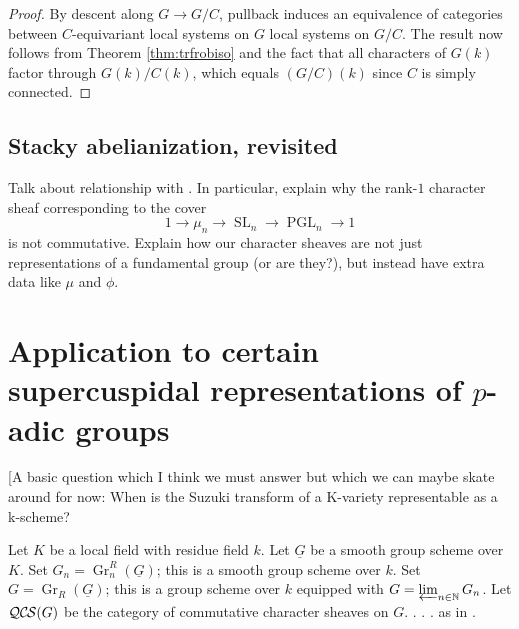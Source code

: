 \documentclass[10pt]{amsart}
\theoremstyle{plain}
\theoremstyle{definition}
\newcommand{\NN}{{\mathbb{N}}}
\newcommand{\Fq}{k}
\DeclareMathOperator{\Gr}{Gr}
\DeclareMathOperator{\SL}{SL}
\DeclareMathOperator{\PGL}{PGL}
\newcommand{\QCS}{{\mathcal{QC\hskip-0.8pt S}}}
\begin{document}
 \begin{proof}
 By descent along $G \to G/C$, pullback induces an equivalence of categories between $C$-equivariant local systems on $G$ local systems on  $G/C$. 
  The result now follows from Theorem \ref{thm:trfrobiso} and the fact that all characters of $G(\Fq)$ factor through
 $G(\Fq)/C(\Fq)$, which equals $(G/C)(\Fq)$ since $C$ is simply connected.
 \end{proof}
 
\subsection{Stacky abelianization, revisited}
 
 Talk about relationship with \cite{kamgarpour:09a}.  In particular, explain why the rank-$1$ character sheaf corresponding
 to the cover
 \[
 1 \to \mu_n \to \SL_n \to \PGL_n \to 1
 \]
 is not commutative.  Explain how our character sheaves are not just representations of a fundamental group
 (or are they?), but instead have extra data like $\mu$ and $\phi$.



\section{Application to certain supercuspidal representations of $p$-adic groups}

[A basic question which I think we must answer but which we can maybe skate around for now:
When is the Suzuki transform of a K-variety representable as a k-scheme?


Let $K$ be a local field with residue field $\Fq$.
Let $\underline{G}$ be a smooth group scheme over $K$.
Set $G_n = \Gr^R_n(\underline{G})$; this is a smooth group scheme over $\Fq$.
Set $G = \Gr_R(\underline{G})$; this is a group scheme over $\Fq$ equipped with $G = \varprojlim_{n\in \NN} G_n$.
Let $\QCS(G)$ be the category of commutative character sheaves on $G$. . . .  as in \cite{cunningham-roe:13a}.
\end{document}
